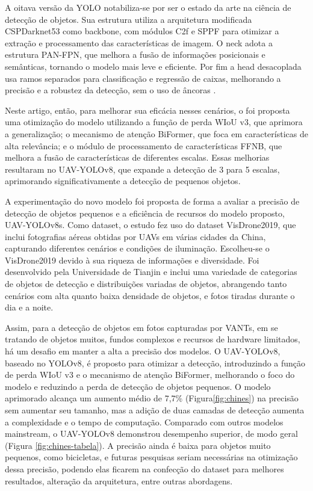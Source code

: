 A oitava versão da YOLO notabiliza-se por ser o estado da arte na ciência de detecção de objetos. Sua estrutura utiliza a arquitetura modificada CSPDarknet53 como backbone, com módulos C2f e SPPF para otimizar a extração e processamento das características de imagem. O neck adota a estrutura PAN-FPN, que melhora a fusão de informações posicionais e semânticas, tornando o modelo mais leve e eficiente. Por fim a head desacoplada usa ramos separados para classificação e regressão de caixas, melhorando a precisão e a robustez da detecção, sem o uso de âncoras \cite{redmon2018yolov3}.

Neste artigo, então, para melhorar sua eficácia nesses cenários, o foi proposta uma otimização do modelo utilizando a função de perda WIoU v3, que aprimora a generalização; o mecanismo de atenção BiFormer, que foca em características de alta relevância; e o módulo de processamento de características FFNB, que melhora a fusão de características de diferentes escalas. Essas melhorias resultaram no UAV-YOLOv8, que expande a detecção de 3 para 5 escalas, aprimorando significativamente a detecção de pequenos objetos.

A experimentação do novo modelo foi proposta de forma a avaliar a precisão de detecção de objetos pequenos e a eficiência de recursos do modelo proposto, UAV-YOLOv8s. Como dataset, o estudo fez uso do dataset VisDrone2019, que inclui fotografias aéreas obtidas por UAVs em várias cidades da China, capturando diferentes cenários e condições de iluminação. Escolheu-se o VisDrone2019 devido à sua riqueza de informações e diversidade. Foi desenvolvido pela Universidade de Tianjin e inclui uma variedade de categorias de objetos de detecção e distribuições variadas de objetos, abrangendo tanto cenários com alta quanto baixa densidade de objetos, e fotos tiradas durante o dia e a noite.

Assim, para a detecção de objetos em fotos capturadas por VANTs, em se tratando de objetos muitos, fundos complexos e recursos de hardware limitados, há um desafio em manter a alta a precisão dos modelos. O UAV-YOLOv8, baseado no YOLOv8, é proposto para otimizar a detecção, introduzindo a função de perda WIoU v3 e o mecanismo de atenção BiFormer, melhorando o foco do modelo e reduzindo a perda de detecção de objetos pequenos. O modelo aprimorado alcança um aumento médio de 7,7\% (Figura\ref{fig:chines}) na precisão sem aumentar seu tamanho, mas a adição de duas camadas de detecção aumenta a complexidade e o tempo de computação. Comparado com outros modelos mainstream, o UAV-YOLOv8 demonstrou desempenho superior, de modo geral (Figura \ref{fig:chines-tabela}). A precisão ainda é baixa para objetos muito pequenos, como bicicletas, e futuras pesquisas seriam necessárias na otimização dessa precisão, podendo elas ficarem na confecção do dataset para melhores resultados, alteração da arquitetura, entre outras abordagens.

